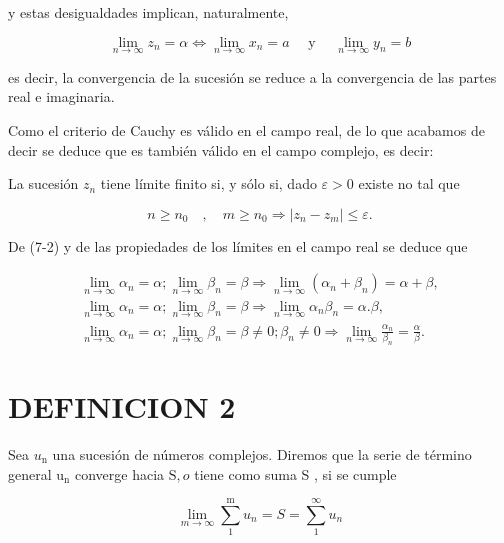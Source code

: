 \documentclass[10pt]{article}
\theoremstyle{plain}
\theoremstyle{definition}
\theoremstyle{remark}
\begin{document}
y estas desigualdades implican, naturalmente,


\begin{equation*}
\lim _{n \rightarrow \infty} z_{n}=\alpha \Leftrightarrow \lim _{n \rightarrow \infty} x_{n}=a \quad \text { y } \quad \lim _{n \rightarrow \infty} y_{n}=b \tag{7-2}
\end{equation*}


es decir, la convergencia de la sucesión se reduce a la convergencia de las partes real e imaginaria.

Como el criterio de Cauchy es válido en el campo real, de lo que acabamos de decir se deduce que es también válido en el campo complejo, es decir:

La sucesión $z_{n}$ tiene límite finito si, y sólo si, dado $\varepsilon>0$ existe no tal que


\begin{equation*}
n \geqslant n_{0} \quad, \quad m \geqslant n_{0} \Rightarrow\left|z_{n}-z_{m}\right| \leqslant \varepsilon . \tag{7.3}
\end{equation*}


De (7-2) y de las propiedades de los límites en el campo real se deduce que


\begin{gather*}
\lim _{n \rightarrow \infty} \alpha_{n}=\alpha ; \lim _{n \rightarrow \infty} \beta_{n}=\beta \Rightarrow \lim _{n \rightarrow \infty}\left(\alpha_{n}+\beta_{n}\right)=\alpha+\beta,  \tag{7-4}\\
\lim _{n \rightarrow \infty} \alpha_{n}=\alpha ; \lim _{n \rightarrow \infty} \beta_{n}=\beta \Rightarrow \lim _{n \rightarrow \infty} \alpha_{n} \beta_{n}=\alpha . \beta,  \tag{7-5}\\
\lim _{n \rightarrow \infty} \alpha_{n}=\alpha ; \lim _{n \rightarrow \infty} \beta_{n}=\beta \neq 0 ; \beta_{n} \neq 0 \Rightarrow \lim _{n \rightarrow \infty} \frac{\alpha_{n}}{\beta_{n}}=\frac{\alpha}{\beta} . \tag{7-6}
\end{gather*}


\section*{DEFINICION 2}
Sea $u_{\mathrm{n}}$ una sucesión de números complejos. Diremos que la serie de término general $\mathrm{u}_{\mathrm{n}}$ converge hacia $\mathrm{S}, o$ tiene como suma S , si se cumple


\begin{equation*}
\lim _{m \rightarrow \infty} \sum_{1}^{\mathrm{m}} u_{n}=S=\sum_{1}^{\infty} u_{n} \tag{7-7}
\end{equation*}
\end{document}
